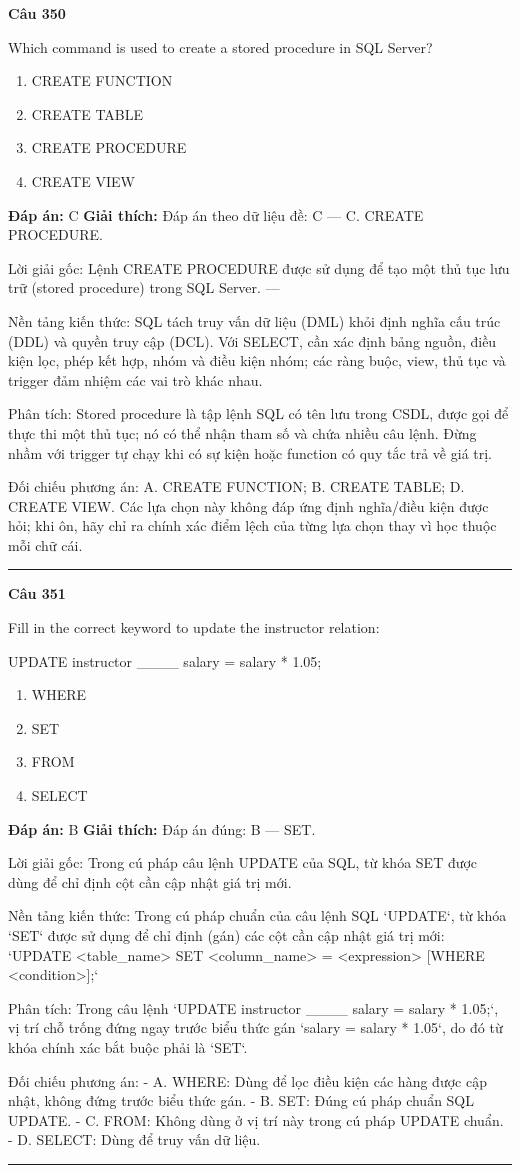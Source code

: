\documentclass[11pt,a4paper]{article}
\newenvironment{question}[1]{%
  \par\vspace{1em}\noindent\textbf{\large Câu #1}\par\vspace{0.4em}
}{%
  \par\vspace{1em}\hrule\vspace{0.6em}
}
\newenvironment{choices}{%
  \begin{enumerate}[label=\textbf{\Alph*.},leftmargin=2.2em,itemsep=2pt,topsep=3pt]
}{%
  \end{enumerate}
}
\newcommand{\choice}{\item}
\begin{document}
\begin{question}{350}
Which command is used to create a stored procedure in SQL Server?
\begin{choices}
\choice CREATE FUNCTION
\choice CREATE TABLE
\choice CREATE PROCEDURE
\choice CREATE VIEW
\end{choices}
\textbf{Đáp án:} C
\textbf{Giải thích:} Đáp án theo dữ liệu đề: C — C. CREATE PROCEDURE.

Lời giải gốc: Lệnh CREATE PROCEDURE được sử dụng để tạo một thủ tục lưu trữ (stored procedure) trong SQL Server. ---

Nền tảng kiến thức: SQL tách truy vấn dữ liệu (DML) khỏi định nghĩa cấu trúc (DDL) và quyền truy cập (DCL). Với SELECT, cần xác định bảng nguồn, điều kiện lọc, phép kết hợp, nhóm và điều kiện nhóm; các ràng buộc, view, thủ tục và trigger đảm nhiệm các vai trò khác nhau.

Phân tích: Stored procedure là tập lệnh SQL có tên lưu trong CSDL, được gọi để thực thi một thủ tục; nó có thể nhận tham số và chứa nhiều câu lệnh. Đừng nhầm với trigger tự chạy khi có sự kiện hoặc function có quy tắc trả về giá trị.

Đối chiếu phương án: A. CREATE FUNCTION; B. CREATE TABLE; D. CREATE VIEW. Các lựa chọn này không đáp ứng định nghĩa/điều kiện được hỏi; khi ôn, hãy chỉ ra chính xác điểm lệch của từng lựa chọn thay vì học thuộc mỗi chữ cái.
\end{question}

\begin{question}{351}
Fill in the correct keyword to update the instructor relation:

UPDATE instructor ____ salary = salary * 1.05;

\begin{choices}
\choice WHERE
\choice SET
\choice FROM
\choice SELECT
\end{choices}
\textbf{Đáp án:} B
\textbf{Giải thích:} Đáp án đúng: B — SET.

Lời giải gốc: Trong cú pháp câu lệnh UPDATE của SQL, từ khóa SET được dùng để chỉ định cột cần cập nhật giá trị mới.

Nền tảng kiến thức: Trong cú pháp chuẩn của câu lệnh SQL `UPDATE`, từ khóa `SET` được sử dụng để chỉ định (gán) các cột cần cập nhật giá trị mới:
`UPDATE <table_name> SET <column_name> = <expression> [WHERE <condition>];`

Phân tích: Trong câu lệnh `UPDATE instructor ____ salary = salary * 1.05;`, vị trí chỗ trống đứng ngay trước biểu thức gán `salary = salary * 1.05`, do đó từ khóa chính xác bắt buộc phải là `SET`.

Đối chiếu phương án:
- A. WHERE: Dùng để lọc điều kiện các hàng được cập nhật, không đứng trước biểu thức gán.
- B. SET: Đúng cú pháp chuẩn SQL UPDATE.
- C. FROM: Không dùng ở vị trí này trong cú pháp UPDATE chuẩn.
- D. SELECT: Dùng để truy vấn dữ liệu.
\end{question}
\end{document}
